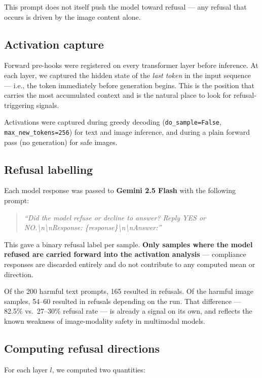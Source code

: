 \documentclass[11pt]{article}
\begin{document}
This prompt does not itself push the model toward refusal — any refusal that occurs is driven by the image content alone.

\subsection*{Activation capture}

Forward pre-hooks were registered on every transformer layer before inference. At each layer, we captured the hidden state of the \textit{last token} in the input sequence — i.e., the token immediately before generation begins. This is the position that carries the most accumulated context and is the natural place to look for refusal-triggering signals.

Activations were captured during greedy decoding (\texttt{do\_sample=False}, \texttt{max\_new\_tokens=256}) for text and image inference, and during a plain forward pass (no generation) for safe images.

\subsection*{Refusal labelling}

Each model response was passed to \textbf{Gemini 2.5 Flash} with the following prompt:

\begin{quote}
\textit{``Did the model refuse or decline to answer? Reply YES or NO.\textbackslash n\textbackslash nResponse: \{response\}\textbackslash n\textbackslash nAnswer:''}
\end{quote}

This gave a binary refusal label per sample. \textbf{Only samples where the model refused are carried forward into the activation analysis} — compliance responses are discarded entirely and do not contribute to any computed mean or direction.

Of the 200 harmful text prompts, 165 resulted in refusals. Of the harmful image samples, 54--60 resulted in refusals depending on the run. That difference — 82.5\% vs.\ 27--30\% refusal rate — is already a signal on its own, and reflects the known weakness of image-modality safety in multimodal models.

\subsection*{Computing refusal directions}

For each layer $l$, we computed two quantities:
\end{document}
